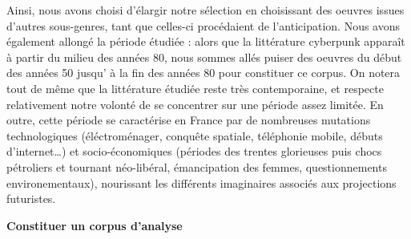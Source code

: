 \documentclass[letterpaper,portrait,12pt]{article}
\begin{document}
	Ainsi, nous avons choisi d'\'{e}largir notre s\'{e}lection en choisissant des oeuvres issues d'autres sous-genres, tant que celles-ci proc\'{e}daient de l'anticipation. Nous avons \'{e}galement allong\'{e} la p\'{e}riode \'{e}tudi\'{e}e : alors que la litt\'{e}rature cyberpunk appara\^{i}t \`{a} partir du milieu des ann\'{e}es 80, nous sommes all\'{e}s puiser des oeuvres du d\'{e}but des ann\'{e}es 50 jusqu' \`{a} la fin des ann\'{e}es 80 pour constituer ce corpus. On notera tout de m\^{e}me que la litt\'{e}rature \'{e}tudi\'{e}e reste tr\`{e}s contemporaine, et respecte relativement notre volont\'{e} de se concentrer sur une p\'{e}riode assez limit\'{e}e. En outre, cette p\'{e}riode se caract\'{e}rise en France par de nombreuses mutations technologiques (\'{e}l\'{e}ctrom\'{e}nager, conqu\^{e}te spatiale, t\'{e}l\'{e}phonie mobile, d\'{e}buts d'internet\ldots{}) et socio-\'{e}conomiques (p\'{e}riodes des trentes glorieuses puis chocs p\'{e}troliers et tournant n\'{e}o-lib\'{e}ral, \'{e}mancipation des femmes, questionnements environementaux), nourissant les diff\'{e}rents imaginaires associ\'{e}s aux projections futuristes.








	\textbf{Constituer un corpus d'analyse}
\end{document}
